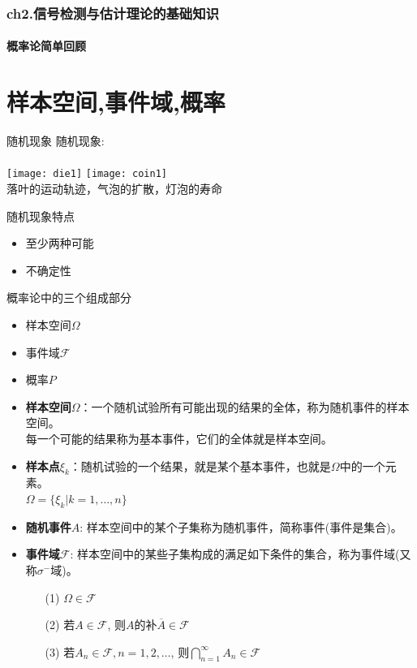 \begin{frame}[shrink]
\frametitle{ch2.信号检测与估计理论的基础知识}
\framesubtitle{概率论简单回顾}
\tableofcontents[hideallsubsections]
\end{frame}


\section{样本空间,事件域,概率}

\begin{frame}{随机现象}
随机现象:\\
~\\
\texttt{[image: die1]}
\texttt{[image: coin1]}\\
落叶的运动轨迹，气泡的扩散，灯泡的寿命
\begin{block}{随机现象特点}
	\begin{itemize}
		\item 至少两种可能
		\item 不确定性
	\end{itemize}
\end{block}
\end{frame}

\begin{frame}{概率论中的三个组成部分}
\begin{itemize}
	\item 样本空间$\Omega$
	\item 事件域$\mathcal{F}$
	\item 概率$P$
\end{itemize}
\end{frame}

\begin{frame}
\begin{itemize}
	\item \textbf{样本空间$\Omega$}：一个随机试验所有可能出现的结果的全体，称为随机事件的样本空间。\\
	每一个可能的结果称为基本事件，它们的全体就是样本空间。
	\item \textbf{样本点$\xi_k$}：随机试验的一个结果，就是某个基本事件，也就是$\Omega$中的一个元素。\\
	$\Omega=\{\xi_k|k=1,\dots,n\}$
	\item \textbf{随机事件$A$}: 样本空间中的某个子集称为随机事件，简称事件(事件是集合)。
    \item \textbf{事件域$\mathcal{F}$}: 样本空间中的某些子集构成的满足如下条件的集合，称为事件域(又称$\sigma^-$域)。
	\begin{itemize}
		\item[(1)] $\Omega\in\mathcal{F}$
		\item[(2)] 若$A\in\mathcal{F}$, 则$A$的补$\overline{A}\in\mathcal{F}$
		\item[(3)] 若$A_n\in\mathcal{F}, n=1,2,\dots$, 则$\bigcap\limits_{n=1}^{\infty}A_n\in\mathcal{F}$
	\end{itemize}
\end{itemize}
\end{frame}


